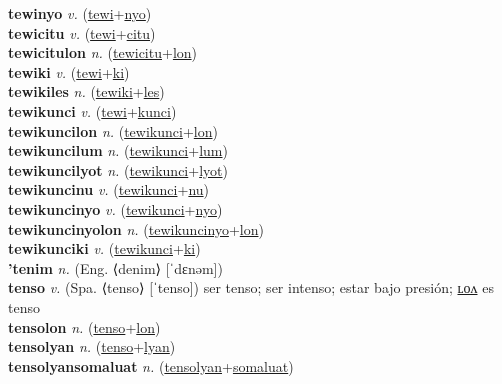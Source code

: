 \textbf{tewinyo} \textit{v.} (\hyperref[tewi]{tewi}+\hyperref[nyo]{nyo})
 \label{tewinyo} \\
\textbf{tewicitu} \textit{v.} (\hyperref[tewi]{tewi}+\hyperref[citu]{citu})
 \label{tewicitu} \\
\textbf{tewicitulon} \textit{n.} (\hyperref[tewicitu]{tewicitu}+\hyperref[lon]{lon})
 \label{tewicitulon} \\
\textbf{tewiki} \textit{v.} (\hyperref[tewi]{tewi}+\hyperref[ki]{ki})
 \label{tewiki} \\
\textbf{tewikiles} \textit{n.} (\hyperref[tewiki]{tewiki}+\hyperref[les]{les})
 \label{tewikiles} \\
\textbf{tewikunci} \textit{v.} (\hyperref[tewi]{tewi}+\hyperref[kunci]{kunci})
 \label{tewikunci} \\
\textbf{tewikuncilon} \textit{n.} (\hyperref[tewikunci]{tewikunci}+\hyperref[lon]{lon})
 \label{tewikuncilon} \\
\textbf{tewikuncilum} \textit{n.} (\hyperref[tewikunci]{tewikunci}+\hyperref[lum]{lum})
 \label{tewikuncilum} \\
\textbf{tewikuncilyot} \textit{n.} (\hyperref[tewikunci]{tewikunci}+\hyperref[lyot]{lyot})
 \label{tewikuncilyot} \\
\textbf{tewikuncinu} \textit{v.} (\hyperref[tewikunci]{tewikunci}+\hyperref[nu]{nu})
 \label{tewikuncinu} \\
\textbf{tewikuncinyo} \textit{v.} (\hyperref[tewikunci]{tewikunci}+\hyperref[nyo]{nyo})
 \label{tewikuncinyo} \\
\textbf{tewikuncinyolon} \textit{n.} (\hyperref[tewikuncinyo]{tewikuncinyo}+\hyperref[lon]{lon})
 \label{tewikuncinyolon} \\
\textbf{tewikunciki} \textit{v.} (\hyperref[tewikunci]{tewikunci}+\hyperref[ki]{ki})
 \label{tewikunciki} \\
\textbf{'tenim} \textit{n.} (Eng. ⟨denim⟩ [ˈdɛnəm])
 \label{'tenim} \\
\textbf{tenso} \textit{v.} (Spa. ⟨tenso⟩ [ˈtenso])
ser tenso; ser intenso; estar bajo presión; \hyperref[tensolon]{ʟᴏᴧ} es tenso \label{tenso} \\
\textbf{tensolon} \textit{n.} (\hyperref[tenso]{tenso}+\hyperref[lon]{lon})
 \label{tensolon} \\
\textbf{tensolyan} \textit{n.} (\hyperref[tenso]{tenso}+\hyperref[lyan]{lyan})
 \label{tensolyan} \\
\textbf{tensolyansomaluat} \textit{n.} (\hyperref[tensolyan]{tensolyan}+\hyperref[somaluat]{somaluat})
 \label{tensolyansomaluat} \\
